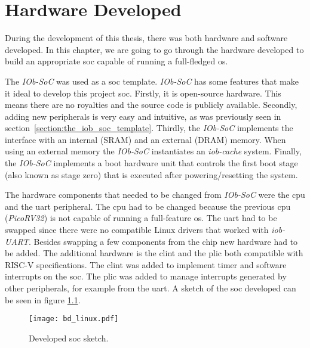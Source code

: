 \chapter{Hardware Developed}
\label{chapter:hardware_developed}
During the development of this thesis, there was both hardware and software developed. In this chapter, we are going to go through the hardware developed to build an appropriate \acrfull{soc} capable of running a full-fledged \acrfull{os}.

The \textit{IOb-SoC} was used as a \acrfull{soc} template. \textit{IOb-SoC} has some features that make it ideal to develop this project \acrshort{soc}. Firstly, it is open-source hardware. This means there are no royalties and the source code is publicly available. Secondly, adding new peripherals is very easy and intuitive, as was previously seen in section~\ref{section:the_iob_soc_template}. Thirdly, the \textit{IOb-SoC} implements the interface with an internal (SRAM) and an external (DRAM) memory. When using an external memory the \textit{IOb-SoC} instantiates an \textit{iob-cache} system. Finally, the \textit{IOb-SoC} implements a boot hardware unit that controls the first boot stage (also known as stage zero) that is executed after powering/resetting the system.

The hardware components that needed to be changed from \textit{IOb-SoC} were the \acrfull{cpu} and the \acrfull{uart} peripheral. The \acrshort{cpu} had to be changed because the previous \acrshort{cpu} (\textit{PicoRV32}) is not capable of running a full-feature \acrlong{os}. The \acrshort{uart} had to be swapped since there were no compatible Linux drivers that worked with \textit{iob-UART}. Besides swapping a few components from the chip new hardware had to be added. The additional hardware is the \acrshort{clint} and the \acrshort{plic} both compatible with RISC-V specifications. The \acrshort{clint} was added to implement timer and software interrupts on the \acrshort{soc}. The \acrshort{plic} was added to manage interrupts generated by other peripherals, for example from the \acrshort{uart}. A sketch of the \acrshort{soc} developed can be seen in figure \ref{fig:bd_linux}.

\begin{figure}[!h]
    \centering
    \texttt{[image: bd\_linux.pdf]}
    \caption{Developed \acrshort{soc} sketch.}
    \label{fig:bd_linux}
\end{figure}

